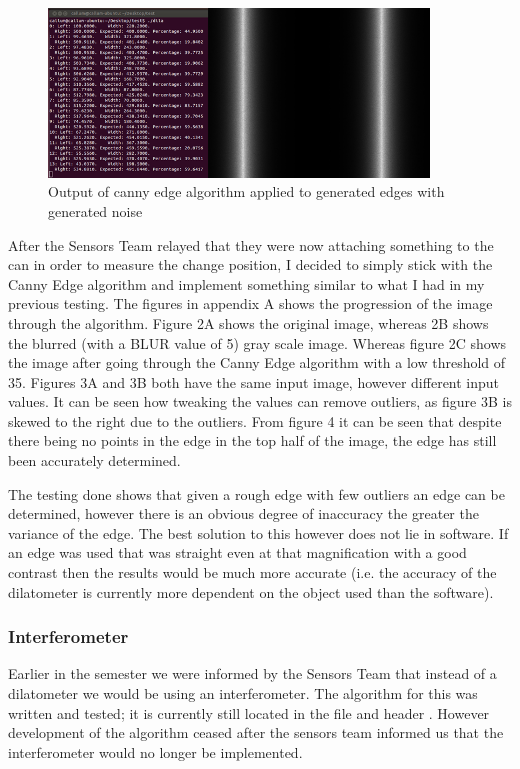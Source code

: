 \begin{figure}[H]
	\centering
	\includegraphics[width=0.9\textwidth]{figures/canny_edges_noise.png}
	\caption{Output of canny edge algorithm applied to generated edges with generated noise} 
	\label{canny_edges_noise.png}
\end{figure}

After the Sensors Team relayed that they were now attaching something to the can in order to measure the change position, I decided to simply stick with the Canny Edge algorithm and implement something similar to what I had in my previous testing.  The figures in appendix A shows the progression of the image through the algorithm.  Figure 2A shows the original image, whereas 2B shows the blurred (with a BLUR value of 5) gray scale image.  Whereas figure 2C shows the image after going through the Canny Edge algorithm with a low threshold of 35.   Figures 3A and 3B both have the same input image, however different input values.  It can be seen how tweaking the values can remove outliers, as figure 3B is skewed to the right due to the outliers.  From figure 4 it can be seen that despite there being no points in the edge in the top half of the image, the edge has still been accurately determined.  

The testing done shows that given a rough edge with few outliers an edge can be determined, however there is an obvious degree of inaccuracy the greater the variance of the edge. The best solution to this however does not lie in software.  If an edge was used that was straight even at that magnification with a good contrast then the results would be much more accurate (i.e. the accuracy of the dilatometer is currently more dependent on the object used than the software). 

\subsubsection{Interferometer}
Earlier in the semester we were informed by the Sensors Team that instead of a dilatometer we would be using an interferometer.  The algorithm for this was written and tested; it is currently still located in the file  and header . However development of the algorithm ceased after the sensors team informed us that the interferometer would no longer be implemented.

